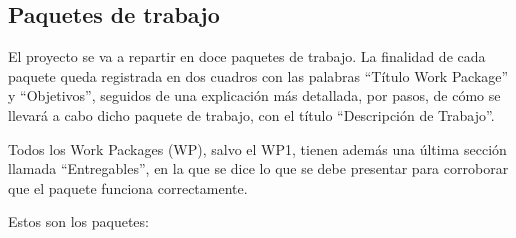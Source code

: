\documentclass[12pt,oneside,a4paper]{article}
\numberwithin{figure}{section}
\begin{document}
\subsection{Paquetes de trabajo}

El proyecto se va a repartir en doce paquetes de trabajo. La finalidad de cada paquete queda registrada en dos cuadros con las palabras “Título Work Package” y “Objetivos”, seguidos de una explicación más detallada, por pasos, de cómo se llevará a cabo dicho paquete de trabajo, con el título “Descripción de Trabajo”.

Todos los Work Packages (WP), salvo el WP1, tienen además una última sección llamada “Entregables”, en la que se dice lo que se debe presentar para corroborar que el paquete funciona correctamente.

Estos son los paquetes:
\end{document}
